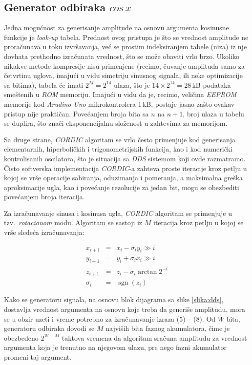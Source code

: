 \documentclass[conference]{IEEEtran}
\DeclareMathOperator{\sgn}{sgn}
\begin{document}
\subsection{Generator odbiraka $cos\,x$}
Jedna mogućnost za generisanje amplitude na osnovu argumenta kosinusne funkcije je \textsl{look-up} tabela. Prednost ovog pristupa je što se vrednost amplitude ne proračunava u toku izvršavanja, već se prostim indeksiranjem tabele (niza) iz nje dovhata prethodno izračunata vrednost, što se može obaviti vrlo brzo. Ukoliko nikakve metode kompresije nisu primenjene (recimo, čuvanje amplituda samo za četvrtinu uglova, imajući u vidu simetriju sinusnog signala, ili neke optimizacije sa bitima), tabela će imati $2^M=2^{14}$ ulaza, što je $14\times 2^{14}=28$\,kB podataka smeštenih u \textsl{ROM} memoriju. Imajući u vidu da je, recimo, veličina \textsl{EEPROM} memorije kod \textsl{Arudino Uno} mikrokontrolera $1$\,kB, postaje jasno zašto ovakav pristup nije praktičan. Povećanjem broja bita sa $n$ na $n+1$, broj ulaza u tabelu se duplira, što znači eksponencijalnu složenost u zahtevima za memorijom. 

Sa druge strane, \textsl{CORDIC} algoritam se vrlo često primenjuje kod generisanja elementarnih, hiperboličkih i trigonometrijskih funkcija, kao i kod numerički kontrolisanih oscilatora, što je situacija sa \textsl{DDS} sistemom koji ovde razmatramo. Čisto softverska implementacija \textsl{CORDIC}-a zahteva proste iteracije kroz petlju u kojoj se vrše operacije sabiranja, oduzimanja i pomeranja, a maksimalna greška aproksimacije ugla, kao i povećanje rezolucije za jedan bit, mogu se obezbediti povećanjem broja iteracija.

Za izračunavanje sinusa i kosinusa ugla, \textsl{CORDIC} algoritam se primenjuje u tzv.~\textit{rotacionom} modu. Algoritam se sastoji iz $M$ iteracija kroz petlju u kojoj se vrše sledeća izračunavanja:

\begin{eqnarray}\label{kordik}
x_{i+1} &=& x_i - \sigma_i y_i \gg i 		\\
y_{i+1} &=& y_i + \sigma_i x_i \gg i 		\\
z_{i+1} &=& z_i - \sigma_i\arctan{2^{-i}}		\\
\sigma_i &=& \sgn(z_i)
\end{eqnarray}

Kako se generatoru signala, na osnovu blok dijagrama sa slike \ref{slika:dds}, dostavlja vrednost argumenta na osnovu koje treba da generiše amplitudu, mora se u obzir uzeti i vreme potrebno za izračunavanje izraza (5) -- (8). Od $W$ bita, generatoru odbiraka dovodi se $M$ najviših bita faznog akumulatora, čime je obezbeđeno $2^{W-M}$ taktova vremena da algoritam sračuna amplitudu za vrednost argumenta koja je trenutno na njegovom ulazu, pre nego fazni akumulator promeni taj argument.
\end{document}
